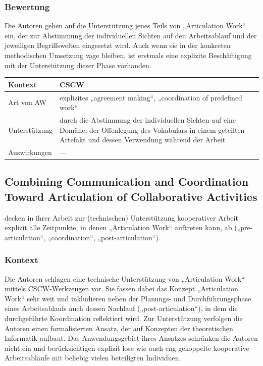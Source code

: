 \subsubsection{Bewertung}
Die Autoren gehen auf die Unterstützung jenes Teils von „Articulation Work“ ein, der zur Abstimmung der individuellen Sichten auf den Arbeitsablauf und der jeweiligen Begriffswelten eingesetzt wird. Auch wenn sie in der konkreten methodischen Umsetzung vage bleiben, ist erstmals eine explizite Beschäftigung mit der Unterstützung dieser Phase vorhanden.
\\[1em]
\begin{tabular}{| p{3cm} | p{10cm} |}
  \hline
  Kontext & \gls{CSCW} \\ \hline
  Art von AW & explizites „agreement making“, „coordination of predefined work“ \\ \hline
  Unterstützung & durch die Abstimmung der individuellen Sichten auf eine Domäne, der Offenlegung des Vokabulars in einem geteilten Artefakt und dessen Verwendung während der Arbeit \\ \hline
  Auswirkungen & --- \\ \hline
\end{tabular}

\subsection{Combining Communication and Coordination Toward Articulation of Collaborative Activities}

\citet{Raposo04} decken in ihrer Arbeit zur (technischen) Unterstützung kooperativer Arbeit explizit alle Zeitpunkte, in denen „Articulation Work“ auftreten kann, ab („pre-articulation“, „coordination“, „post-articulation“).

\subsubsection{Kontext}

Die Autoren schlagen eine technische Unterstützung von „Articulation Work“ mittels \gls{CSCW}-Werkzeugen vor. Sie fassen dabei das Konzept „Articulation Work“ sehr weit und inkludieren neben der Planungs- und Durchführungsphase eines Arbeitsablaufs auch dessen Nachlauf („post-articulation“), in dem die durchgeführte Koordination reflektiert wird. Zur Unterstützung verfolgen die Autoren einen formalisierten Ansatz, der auf Konzepten der theoretischen Informatik aufbaut. Das Anwendungsgebiet ihres Ansatzes schränken die Autoren nicht ein und berücksichtigen explizit lose wie auch eng gekoppelte kooperative Arbeitsabläufe mit beliebig vielen beteiligten Individuen.

